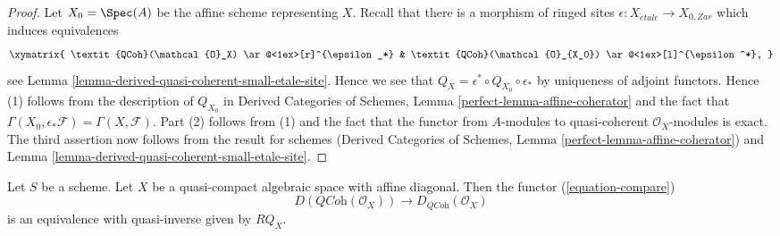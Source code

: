\begin{proof}
Let $X_0 = \Spec(A)$ be the affine scheme representing $X$.
Recall that there is a morphism of ringed sites
$\epsilon : X_{\acute{e}tale} \to X_{0, Zar}$
which induces equivalences
$$
\xymatrix{
\textit{QCoh}(\mathcal{O}_X) \ar@<1ex>[r]^{\epsilon_*} &
\textit{QCoh}(\mathcal{O}_{X_0}) \ar@<1ex>[l]^{\epsilon^*},
}
$$
see Lemma
\ref{lemma-derived-quasi-coherent-small-etale-site}.
Hence we see that $Q_X = \epsilon^* \circ Q_{X_0} \circ \epsilon_*$
by uniqueness of adjoint functors. Hence (1) follows from
the description of $Q_{X_0}$ in
Derived Categories of Schemes, Lemma \ref{perfect-lemma-affine-coherator}
and the fact that
$\Gamma(X_0, \epsilon_*\mathcal{F}) = \Gamma(X, \mathcal{F})$.
Part (2) follows from (1) and the fact that the functor
from $A$-modules to quasi-coherent $\mathcal{O}_X$-modules is exact.
The third assertion now follows from the result for schemes
(Derived Categories of Schemes, Lemma \ref{perfect-lemma-affine-coherator})
and Lemma
\ref{lemma-derived-quasi-coherent-small-etale-site}.
\end{proof}

\begin{proposition}
\label{proposition-quasi-compact-affine-diagonal}
Let $S$ be a scheme. Let $X$ be a quasi-compact algebraic space with affine
diagonal. Then the functor (\ref{equation-compare})
$$
D(\textit{QCoh}(\mathcal{O}_X))
\longrightarrow
D_{\textit{QCoh}}(\mathcal{O}_X)
$$
is an equivalence with quasi-inverse given by $RQ_X$.
\end{proposition}

